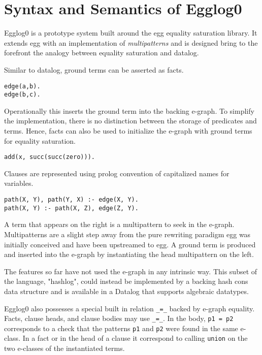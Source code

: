 \documentclass[sigplan,10pt,review]{acmart} %
\begin{document}
\section{Syntax and Semantics of Egglog0}

Egglog0 is a prototype system built around the egg equality saturation library. It extends egg with an implementation of \emph{multipatterns} and is designed bring to the forefront the analogy between equality saturation and datalog.

Similar to datalog, ground terms can be asserted as facts.

\begin{lstlisting}
edge(a,b).
edge(b,c).
\end{lstlisting}

Operationally this inserts the ground term into the backing e-graph. To simplify the implementation, there is no distinction between the storage of predicates and terms. Hence, facts can also be used to initialize the e-graph with ground terms for equality saturation.

\begin{lstlisting}
add(x, succ(succ(zero))).
\end{lstlisting}

Clauses are represented using prolog convention of capitalized names for variables.

\begin{lstlisting}
path(X, Y), path(Y, X) :- edge(X, Y).
path(X, Y) :- path(X, Z), edge(Z, Y).
\end{lstlisting}

A term that appears on the right is a multipattern to seek in the e-graph. Multipatterns are a slight step away from the pure rewriting paradigm egg was initially conceived and have been upstreamed to egg. A ground term is produced and inserted into the e-graph by instantiating the head multipattern on the left.

The features so far have not used the e-graph in any intrinsic way. This subset of the language, "hashlog", could instead be implemented by a backing hash cons data structure and is available in a Datalog that supports algebraic datatypes.

Egglog0 also possesses a special built in relation \lstinline{_=_} backed by e-graph equality. Facts, clause heads, and clause bodies may use \lstinline{_=_}. In the body, \lstinline{p1 = p2} corresponds to a check that the patterns \lstinline{p1} and \lstinline{p2} were found in the same e-class.
In a fact or in the head of a clause it correspond to calling \lstinline{union} on the two e-classes of the instantiated terms.
\end{document}
